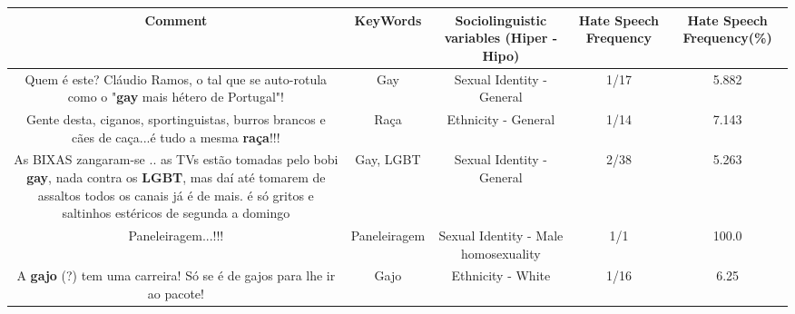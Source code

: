 \documentclass[11pt]{article}
\newlength\mylength
\begin{document}
\begin{center}
\setlength\mylength{\dimexpr\textwidth - 1\arrayrulewidth - 50\tabcolsep}
\begin{longtable}{|C{.65\mylength}|C{.30\mylength}|C{.12\mylength}|C{.12\mylength}|C{.12\mylength}|}
\hline
\textbf{Comment} & \textbf{KeyWords} & \textbf{Sociolinguistic variables (Hiper - Hipo)}  & \textbf{Hate Speech Frequency} & \textbf{Hate Speech Frequency(\%)} \\
\hline{}\small Quem é este? Cláudio Ramos, o tal que se auto-rotula como o "\textbf{gay} mais hétero de Portugal"!\normalsize   & Gay & Sexual Identity - General & 1/17 & 5.882 \\  \hline
  \small Gente desta, ciganos, sportinguistas, burros brancos e cães de caça...é tudo a mesma \textbf{raça}!!!\normalsize   & Raça & Ethnicity - General & 1/14 & 7.143 \\  \hline
  \small As BIXAS zangaram-se .. as TVs estão tomadas pelo bobi \textbf{gay}, nada contra os \textbf{LGBT}, mas daí até tomarem de assaltos todos os canais já é de mais. é só gritos e saltinhos estéricos de segunda a domingo\normalsize   & Gay, LGBT & Sexual Identity - General & 2/38 & 5.263 \\  \hline
  \small Paneleiragem...!!!\normalsize   & Paneleiragem & Sexual Identity - Male homosexuality & 1/1 & 100.0 \\  \hline
  \small A \textbf{gajo} (?) tem uma carreira! Só se é de gajos para lhe ir ao pacote!\normalsize   & Gajo & Ethnicity - White & 1/16 & 6.25 \\  \hline
  
\end{longtable}
\end{center}
\end{document}
